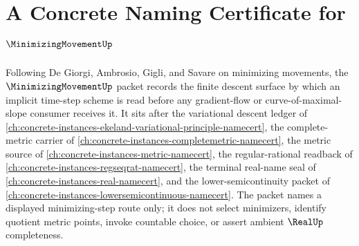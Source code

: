 \chapter{A Concrete Naming Certificate for $\MinimizingMovementUp$}
\label{ch:concrete-instances-minimizing-movement-namecert}

Following De Giorgi, Ambrosio, Gigli, and Savare on minimizing movements, the $\MinimizingMovementUp$ packet records the finite descent surface by which an implicit time-step scheme is read before any gradient-flow or curve-of-maximal-slope consumer receives it. It sits after the variational descent ledger of \autoref{ch:concrete-instances-ekeland-variational-principle-namecert}, the complete-metric carrier of \autoref{ch:concrete-instances-completemetric-namecert}, the metric source of \autoref{ch:concrete-instances-metric-namecert}, the regular-rational readback of \autoref{ch:concrete-instances-regseqrat-namecert}, the terminal real-name seal of \autoref{ch:concrete-instances-real-namecert}, and the lower-semicontinuity packet of \autoref{ch:concrete-instances-lowersemicontinuous-namecert}. The packet names a displayed minimizing-step route only; it does not select minimizers, identify quotient metric points, invoke countable choice, or assert ambient $\RealUp$ completeness.

